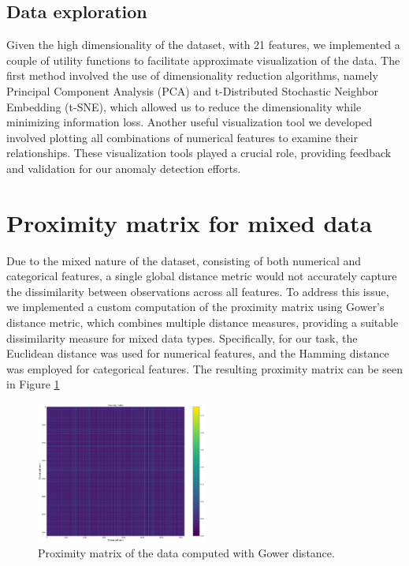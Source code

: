 \documentclass[9pt,twocolumn]{article}
\begin{document}
\subsection{Data exploration}
Given the high dimensionality of the dataset, with 21 features, we implemented a couple of utility functions to facilitate approximate visualization of the data. The first method involved the use of dimensionality reduction algorithms, namely Principal Component Analysis (PCA) and t-Distributed Stochastic Neighbor Embedding (t-SNE), which allowed us to reduce the dimensionality while minimizing information loss.
Another useful visualization tool we developed involved plotting all combinations of numerical features to examine their relationships. These visualization tools played a crucial role, providing feedback and validation for our anomaly detection efforts.

\section{Proximity matrix for mixed data}
Due to the mixed nature of the dataset, consisting of both numerical and categorical features, a single global distance metric would not accurately capture the dissimilarity between observations across all features. To address this issue, we implemented a custom computation of the proximity matrix using Gower's distance metric, which combines multiple distance measures, providing a suitable dissimilarity measure for mixed data types. Specifically, for our task, the Euclidean distance was used for numerical features, and the Hamming distance was employed for categorical features. The resulting proximity matrix can be seen in Figure \ref{fig:proxmat}

\begin{figure}[h]
    \centering
    \includegraphics[width=0.5\textwidth]{images/proxmat.png}
    \caption{Proximity matrix of the data computed with Gower distance.}
    \label{fig:proxmat}
 \end{figure}
\end{document}
